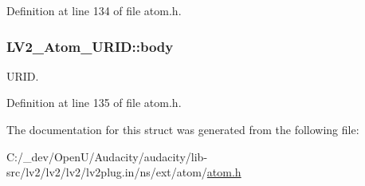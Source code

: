 Definition at line 134 of file atom.\+h.

\subsubsection[{\texorpdfstring{body}{body}}]{ L\+V2\+\_\+\+Atom\+\_\+\+U\+R\+I\+D\+::body}\hypertarget{struct_l_v2___atom___u_r_i_d_a6f5957eed2cfbded3e8c6fe7524111cf}{}\label{struct_l_v2___atom___u_r_i_d_a6f5957eed2cfbded3e8c6fe7524111cf}
U\+R\+ID. 

Definition at line 135 of file atom.\+h.



The documentation for this struct was generated from the following file\+:\begin{DoxyCompactItemize}
\item 
C\+:/\+\_\+dev/\+Open\+U/\+Audacity/audacity/lib-\/src/lv2/lv2/lv2/lv2plug.\+in/ns/ext/atom/\hyperlink{atom_8h}{atom.\+h}\end{DoxyCompactItemize}

